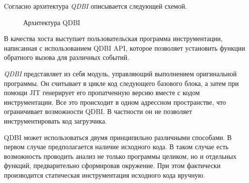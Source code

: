 Cогласно \cite{QDBI} архитектура \emph{QDBI} описывается следующей схемой.
\begin{figure}[H]
    \caption{Архитектура QDBI}
    \label{fig:qdbi}
\end{figure}

В качества хоста выступает пользовательская программа инструментации, написанная с использованием QDBI API, которое позволяет установить функции обратного вызова для различных событий.

\emph{QDBI} представляет из себя модуль, управляющий выполнением оригинальной программы. Он считывает в цикле код следующего базового блока, а затем при помощи JIT генерирует его пропатченную версию вместе с кодом инструментации. Все это происходит в одном адрессном пространстве, что ограничивает возможности QDBI. В частности он не позволяет инструментировать код загрузчика.

QDBI может использоваться двумя принципильно различными способами. В первом случае предполагается наличие исходного кода. В таком случае есть возможность проводить анализ не только программы целиком, но и отдельных функций, предварительно сформировав окружение. При этом фактически производится статическая инструментация исходного кода вручную.

